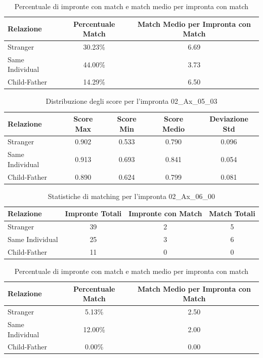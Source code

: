 \begin{table}[htbp]
\centering
\caption{Percentuale di impronte con match e match medio per impronta con match}
\label{tab:match_percentage_02_Ax_05_03}
\begin{tabular}{|l|c|c|}
\hline
\textbf{Relazione} & \textbf{Percentuale Match} & \textbf{Match Medio per Impronta con Match} \\
\hline
Stranger & 30.23\% & 6.69 \\
\hline
Same Individual & 44.00\% & 3.73 \\
\hline
Child-Father & 14.29\% & 6.50 \\
\hline
\end{tabular}
\end{table}


\begin{table}[htbp]
\centering
\caption{Distribuzione degli score per l'impronta 02\_Ax\_05\_03}
\label{tab:scores_02_Ax_05_03}
\begin{tabular}{|l|c|c|c|c|}
\hline
\textbf{Relazione} & \textbf{Score Max} & \textbf{Score Min} & \textbf{Score Medio} & \textbf{Deviazione Std} \\
\hline
Stranger & 0.902 & 0.533 & 0.790 & 0.096 \\
\hline
Same Individual & 0.913 & 0.693 & 0.841 & 0.054 \\
\hline
Child-Father & 0.890 & 0.624 & 0.799 & 0.081 \\
\hline
\end{tabular}
\end{table}


\begin{table}[htbp]
\centering
\caption{Statistiche di matching per l'impronta 02\_Ax\_06\_00}
\label{tab:results_02_Ax_06_00}
\begin{tabular}{|l|c|c|c|}
\hline
\textbf{Relazione} & \textbf{Impronte Totali} & \textbf{Impronte con Match} & \textbf{Match Totali} \\
\hline
Stranger & 39 & 2 & 5 \\
\hline
Same Individual & 25 & 3 & 6 \\
\hline
Child-Father & 11 & 0 & 0 \\
\hline
\end{tabular}
\end{table}


\begin{table}[htbp]
\centering
\caption{Percentuale di impronte con match e match medio per impronta con match}
\label{tab:match_percentage_02_Ax_06_00}
\begin{tabular}{|l|c|c|}
\hline
\textbf{Relazione} & \textbf{Percentuale Match} & \textbf{Match Medio per Impronta con Match} \\
\hline
Stranger & 5.13\% & 2.50 \\
\hline
Same Individual & 12.00\% & 2.00 \\
\hline
Child-Father & 0.00\% & 0.00 \\
\hline
\end{tabular}
\end{table}


